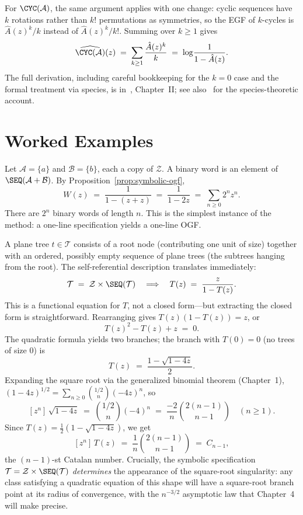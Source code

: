 For $\CYC(\mathcal{A})$, the same argument applies with one change: cyclic sequences
have $k$ rotations rather than $k!$ permutations as symmetries, so the EGF of
$k$-cycles is $\hat{A}(z)^k / k$ instead of $\hat{A}(z)^k / k!$.  Summing over
$k \ge 1$ gives
\[
  \widehat{\CYC(\mathcal{A})}(z)
  \;=\; \sum_{k \ge 1} \frac{\hat{A}(z)^k}{k}
  \;=\; \log\!\frac{1}{1 - \hat{A}(z)}.
\]
The full derivation, including careful bookkeeping for the $k = 0$ case and the
formal treatment via species, is in~\cite{FlajoletSedgewick2009}, Chapter~II;
see also~\cite{BergeronLabelleLeRoux1998} for the species-theoretic account.

\section{Worked Examples}

\begin{example}
Let $\mathcal{A} = \{a\}$ and $\mathcal{B} = \{b\}$, each a copy of $\mathcal{Z}$.
A binary word is an element of $\SEQ(\mathcal{A} + \mathcal{B})$.  By
Proposition~\ref{prop:symbolic-ogf},
\[
  W(z) \;=\; \frac{1}{1 - (z + z)} \;=\; \frac{1}{1 - 2z} \;=\; \sum_{n \ge 0} 2^n z^n.
\]
There are $2^n$ binary words of length $n$.  This is the simplest instance of the
method: a one-line specification yields a one-line OGF.
\end{example}

\begin{example}
A plane tree $t \in \mathcal{T}$ consists of a root node (contributing one unit of
size) together with an ordered, possibly empty sequence of plane trees (the
subtrees hanging from the root).  The self-referential description translates
immediately:
\[
  \mathcal{T} \;=\; \mathcal{Z} \times \SEQ(\mathcal{T})
  \quad\Longrightarrow\quad
  T(z) \;=\; \frac{z}{1 - T(z)}.
\]
This is a functional equation for $T$, not a closed form---but extracting the
closed form is straightforward.  Rearranging gives $T(z)(1 - T(z)) = z$, or
\[
  T(z)^2 - T(z) + z \;=\; 0.
\]
The quadratic formula yields two branches; the branch with $T(0) = 0$ (no trees of
size $0$) is
\[
  T(z) \;=\; \frac{1 - \sqrt{1 - 4z}}{2}.
\]
Expanding the square root via the generalized binomial theorem (Chapter~1),
$(1-4z)^{1/2} = \sum_{n \ge 0} \binom{1/2}{n}(-4z)^n$, so
\[
  [z^n]\,\sqrt{1-4z}
  \;=\; \binom{1/2}{n}(-4)^n
  \;=\; \frac{-2}{n}\binom{2(n-1)}{n-1} \quad (n \ge 1).
\]
Since $T(z) = \tfrac{1}{2}(1 - \sqrt{1-4z})$, we get
\[
  [z^n]\,T(z)
  \;=\; \frac{1}{n}\binom{2(n-1)}{n-1}
  \;=\; C_{n-1},
\]
the $(n-1)$-st Catalan number.  Crucially, the symbolic specification
$\mathcal{T} = \mathcal{Z} \times \SEQ(\mathcal{T})$ \emph{determines} the
appearance of the square-root singularity: any class satisfying a quadratic
equation of this shape will have a square-root branch point at its radius of
convergence, with the $n^{-3/2}$ asymptotic law that Chapter~4 will make
precise.
\end{example}

